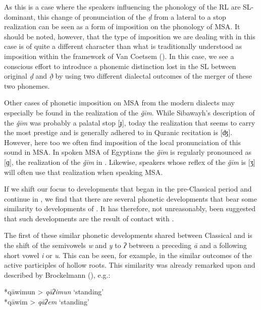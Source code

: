 \documentclass[output=paper]{langsci/langscibook}
\begin{document}
As this is a case where the speakers influencing the phonology of the {RL} are SL-dominant, this change of pronunciation of the \textit{ḍ} from a lateral to a stop realization can be seen as a form of {imposition} on the phonology of MSA. It should be noted, however, that the type of {imposition} we are dealing with in this case is of quite a different character than what is traditionally understood as {imposition} within the framework of Van Coetsem (\citeyear{VanCoetsem1988,VanCoetsem2000}). In this case, we see a conscious effort to introduce a phonemic distinction lost in the {SL} between original \textit{ḍ} and \textit{ð̣} by using two different dialectal outcomes of the {merger} of these two phonemes.

Other cases of phonetic {imposition} on MSA from the modern dialects may especially be found in the realization of the \textit{ǧīm}. While Sibawayh’s description of the \textit{ǧīm} was probably a palatal stop [ɟ], today the realization that seems to carry the most {prestige} and is generally adhered to in Quranic recitation is [ʤ]. However, here too we often find {imposition} of the local pronunciation of this sound in MSA. In spoken MSA of Egyptians the \textit{ǧīm} is regularly pronounced as [ɡ], the realization of the \textit{ǧīm} in  . Likewise,   speakers whose reflex of the \textit{ǧīm} is [ʒ] will often use that realization when speaking MSA.

If we shift our focus to developments that began in the pre-Classical period and continue in , we find that there are several phonetic developments that bear some similarity to developments of . It has therefore, not unreasonably, been suggested that such developments are the result of contact with .

The first of these similar phonetic developments shared between Classical  and  is the shift of the semivowels  \textit{w} and \textit{y} to \textit{ʔ} between a preceding \textit{ā} and a following short vowel \textit{i} or \textit{u}. This can be seen, for example, in the similar outcomes of the active participles of hollow {roots}. This similarity was already remarked upon and described by Brockelmann (\citeyear[138--139]{Brockelmann1908}), e.g.:

\ea
\ea {} *qāwimun > \textit{qāʔimun} ‘standing’\\
\ex {} *qāwim > \textit{qāʔem} ‘standing’
\z
\z
\end{document}
